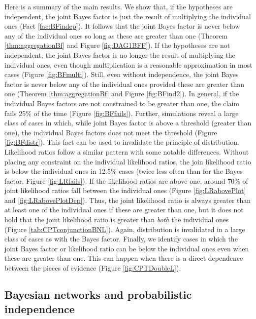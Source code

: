 \documentclass[
  10pt,
  dvipsnames,enabledeprecatedfontcommands]{scrartcl}
\begin{document}
Here is a summary of the main results. We show that, if the hypotheses
are independent, the joint Bayes factor is just the result of
multiplying the individual ones (Fact \ref{fac:BFindep}). It follows
that the joint Bayes factor is never below any of the individual ones so
long as these are greater than one (Theorem \ref{thm:aggregationBf} and
Figure \ref{fig:DAG1BFF}). If the hypotheses are not independent, the
joint Bayes factor is no longer the result of multiplying the individual
ones, even though multiplication is a reasonable approximation in most
cases (Figure \ref{fig:BFmulti}). Still, even without independence, the
joint Bayes factor is never below any of the individual ones provided
these are greater than one (Theorem \ref{thm:aggregationBf} and Figure
\ref{fig:BFind2}). In general, if the individual Bayes factors are not
constrained to be greater than one, the claim fails 25\% of the time
(Figure \ref{fig:BFfails}). Further, simulations reveal a large class of
cases in which, while joint Bayes factor is above a threshold (greater
than one), the individual Bayes factors does not meet the threshold
(Figure \ref{fig:BFdistr}). This fact can be used to invalidate the
principle of distribution. Likelihood ratios follow a similar pattern
with some notable differences. Without placing any constraint on the
individual likelihood ratios, the join likelihood ratio is below the
individual ones in 12.5\% cases (twice less often than for the Bayes
factor; Figure \ref{fig:LRfails}). If the likelihood ratios are above
one, around 70\% of joint likelihood ratios fall between the individual
ones (Figure \ref{fig:LRabovePlot} and \ref{fig:LRabovePlotDep}). Thus,
the joint likelihood ratio is always greater than at least one of the
individual ones if these are greater than one, but it does not hold that
the joint likelihood ratio is greater than \textit{both} the individual
ones (Figure \ref{tab:CPTconjunctionBNL}). Again, distribution is
invalidated in a large class of cases as with the Bayes factor. Finally,
we identify cases in which the joint Bayes factor or likelihood ratio
can be below the individual ones even when these are greater than one.
This can happen when there is a direct dependence between the pieces of
evidence (Figure \ref{fig:CPTDoubleL}).

\hypertarget{bayesian-networks-and-probabilistic-independence}{%
\subsection*{Bayesian networks and probabilistic
independence}\label{bayesian-networks-and-probabilistic-independence}}
\end{document}
